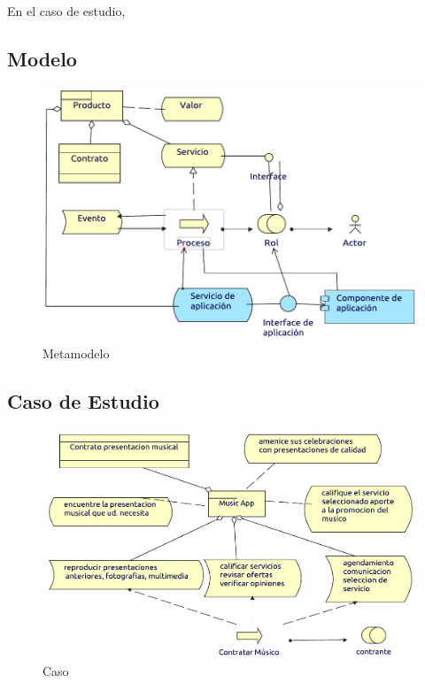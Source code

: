 En el caso de estudio, 
\subsection{Modelo}
\begin{figure}[h!]
	\centering
	\includegraphics[width=\linewidth]{Arquitectura/Negocio/imgs/ProductoMetamodelo.pdf}
	\caption{Metamodelo}
\end{figure}
\newpage
\subsection{Caso de Estudio}

\begin{figure}[h!]
	\centering
	\includegraphics[width=\linewidth]{Arquitectura/Negocio/imgs/Producto.pdf}
	\caption{Caso}
\end{figure}
\newpage

